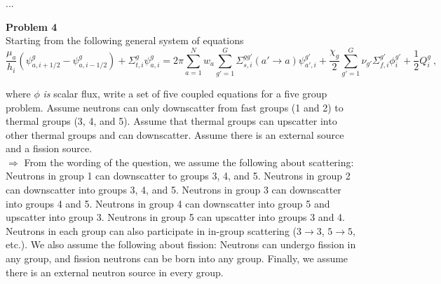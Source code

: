 \documentclass[10pt]{article}
\begin{document}
...





\newpage
\noindent \textbf{Problem 4}\\
Starting from the following general system of equations
%
\begin{equation*}
\frac{\mu_a}{h_i}(\psi_{a,i+1/2}^g - \psi_{a,i-1/2}^g)+ \Sigma_{t,i}^g\psi_{a,i}^g = 2\pi\sum_{a=1}^N w_a \sum_{g'=1}^G \Sigma_{s, i}^{gg'}(a'\rightarrow a)\psi_{a',i}^{g'} + \frac{\chi_g}{2}\sum_{g'=1}^G \nu_{g'}\Sigma_{f,i}^{g'} \phi_{i}^{g'} + \frac{1}{2}Q_i^g\:,
\end{equation*}

where  $\phi$ \textit{is} scalar flux, write a set of five coupled equations for a five group problem. Assume neutrons can only downscatter from fast groups (1 and 2) to thermal groups (3, 4, and 5). Assume that thermal groups can upscatter into other thermal groups and can downscatter. Assume there is an external source and a fission source.\\ 

$\Rightarrow$ From the wording of the question, we assume the following about scattering: Neutrons in group 1 can downscatter to groups 3, 4, and 5. Neutrons in group 2 can downscatter into groups 3, 4, and 5. Neutrons in group 3 can downscatter into groups 4 and 5. Neutrons in group 4 can downscatter into group 5 and upscatter into group 3. Neutrons in group 5 can upscatter into groups 3 and 4. Neutrons in each group can also participate in in-group scattering ($3\rightarrow3$, $5\rightarrow5$, etc.). We also assume the following about fission: Neutrons can undergo fission in any group, and fission neutrons can be born into any group. Finally, we assume there is an external neutron source in every group. \\ 

\end{document}

